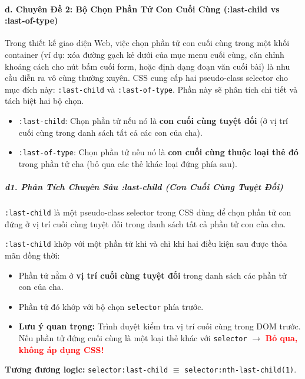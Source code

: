 \documentclass[11pt,oneside]{book}
\newcommand{\codeinline}[1]{\textcolor{accentOrange}{\texttt{#1}}}
\begin{document}
\paragraph{d. Chuyên Đề 2: Bộ Chọn Phần Tử Con Cuối Cùng (:last-child vs :last-of-type)}

Trong thiết kế giao diện Web, việc chọn phần tử con cuối cùng trong một khối container (ví dụ: xóa đường gạch kẻ dưới của mục menu cuối cùng, căn chỉnh khoảng cách cho nút bấm cuối form, hoặc định dạng đoạn văn cuối bài) là nhu cầu diễn ra vô cùng thường xuyên. CSS cung cấp hai pseudo-class selector cho mục đích này: \codeinline{:last-child} và \codeinline{:last-of-type}. Phần này sẽ phân tích chi tiết và tách biệt hai bộ chọn.

\begin{conceptBox}
\begin{itemize}[leftmargin=1.5em, itemsep=3pt, parsep=0pt]
    \item \codeinline{:last-child}: Chọn phần tử nếu nó là \textbf{con cuối cùng tuyệt đối} (ở vị trí cuối cùng trong danh sách tất cả các con của cha).
    \item \codeinline{:last-of-type}: Chọn phần tử nếu nó là \textbf{con cuối cùng thuộc loại thẻ đó} trong phần tử cha (bỏ qua các thẻ khác loại đứng phía sau).
\end{itemize}
\end{conceptBox}


\subparagraph{d1. Phân Tích Chuyên Sâu :last-child (Con Cuối Cùng Tuyệt Đối)}

\codeinline{:last-child} là một pseudo-class selector trong CSS dùng để chọn phần tử con đứng ở vị trí cuối cùng tuyệt đối trong danh sách tất cả phần tử con của cha.

\begin{conceptBox}
\codeinline{:last-child} khớp với một phần tử khi và chỉ khi hai điều kiện sau được thỏa mãn đồng thời:
\begin{itemize}[leftmargin=1.5em, itemsep=2pt, parsep=0pt]
    \item Phần tử nằm ở \textbf{vị trí cuối cùng tuyệt đối} trong danh sách các phần tử con của cha.
    \item Phần tử đó khớp với bộ chọn \codeinline{selector} phía trước.
    \item \textbf{Lưu ý quan trọng:} Trình duyệt kiểm tra vị trí cuối cùng trong DOM trước. Nếu phần tử đứng cuối cùng là một loại thẻ khác với \codeinline{selector} $\rightarrow$ \textcolor{red}{\textbf{Bỏ qua, không áp dụng CSS!}}
\end{itemize}
\par\vspace{4pt}
\textbf{Tương đương logic:} \codeinline{selector:last-child} $\equiv$ \codeinline{selector:nth-last-child(1)}.
\end{conceptBox}
\end{document}
